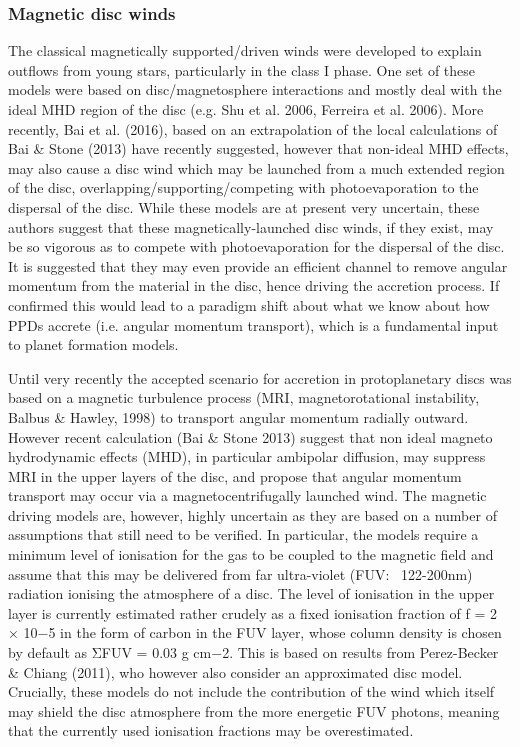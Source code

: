 \documentclass[10pt,fleqn,twoside]{article}
\begin{document}
\subsubsection{Magnetic disc winds}

The classical magnetically supported/driven winds were developed to explain outflows from young stars, particularly in the class I phase. One set of these models were based on disc/magnetosphere interactions and mostly deal with the ideal MHD region of the disc (e.g. Shu et al. 2006, Ferreira et al. 2006). 
More recently, Bai et al. (2016), based on an extrapolation of the local calculations of Bai \& Stone (2013) have recently suggested, however that non-ideal MHD effects, may also cause a disc wind which may be launched from a much extended region of the disc, overlapping/supporting/competing with photoevaporation to the dispersal of the disc. While these models are at present very uncertain, these authors suggest that these magnetically-launched disc winds, if they exist, may be so vigorous as to compete with photoevaporation for the dispersal of the disc. It is suggested that they may even provide an efficient channel to remove angular momentum from the material in the disc, hence driving the accretion process. If confirmed this would lead to a paradigm shift about what we know about how PPDs accrete (i.e. angular momentum transport), which is a fundamental input to planet formation models. 

Until very recently the accepted scenario for accretion in protoplanetary discs was based on a magnetic turbulence process (MRI, magnetorotational instability, Balbus \& Hawley, 1998) to transport angular momentum radially outward. However recent calculation (Bai \& Stone 2013) suggest that non ideal magneto hydrodynamic effects (MHD), in particular ambipolar diffusion, may suppress MRI in the upper layers of the disc, and propose that angular momentum transport may occur via a magnetocentrifugally launched wind. The magnetic driving models are, however, highly uncertain as they are based on a number of assumptions that still need to be verified. In particular, the models require a minimum level of ionisation for the gas to be coupled to the magnetic field and assume that this may be delivered from far ultra-violet (FUV: ~122-200nm) radiation ionising the atmosphere of a disc. The level of ionisation in the upper layer is currently estimated rather crudely as a fixed ionisation fraction of f = 2 × 10−5 in the form of carbon in the FUV layer, whose column density is chosen by default as ΣFUV = 0.03 g cm−2. This is based on results from Perez-Becker \& Chiang (2011), who however also consider an approximated disc model. Crucially, these models do not include the contribution of the wind which itself may shield the disc atmosphere from the more energetic FUV photons, meaning that the currently used ionisation fractions may be overestimated.
\end{document}
